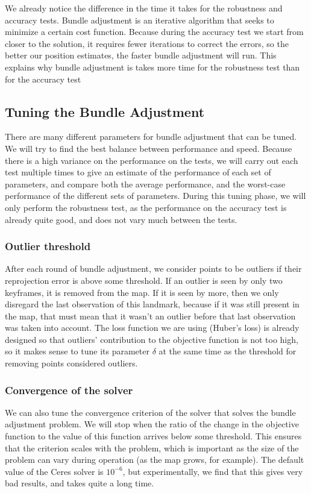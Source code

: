 We already notice the difference in the time it takes for the robustness and accuracy tests. Bundle adjustment is an iterative algorithm that seeks to minimize a certain cost function. Because during the accuracy test we start from closer to the solution, it requires fewer iterations to correct the errors, so the better our position estimates, the faster bundle adjustment will run. This explains why bundle adjustment is takes more time for the robustness test than for the accuracy test


\subsection{Tuning the Bundle Adjustment}
There are many different parameters for bundle adjustment that can be tuned. We will try to find the best balance between performance and speed. Because there is a high variance on the performance on the tests, we will carry out each test multiple times to give an estimate of the performance of each set of parameters, and compare both the average performance, and the worst-case performance of the different sets of parameters. During this tuning phase, we will only perform the robustness test, as the performance on the accuracy test is already quite good, and does not vary much between the tests.

\subsubsection{Outlier threshold}\label{sec:outliers}
After each round of bundle adjustment, we consider points to be outliers if their reprojection error is above some threshold. If an outlier is seen by only two keyframes, it is removed from the map. If it is seen by more, then we only disregard the last observation of this landmark, because if it was still present in the map, that must mean that it wasn't an outlier before that last observation was taken into account. The loss function we are using (Huber's loss) is already designed so that outliers' contribution to the objective function is not too high, so it makes sense to tune its parameter $\delta$ at the same time as the threshold for removing points considered outliers.\\

\subsubsection{Convergence of the solver}
We can also tune the convergence criterion of the solver that solves the bundle adjustment problem. We will stop when the ratio of the change in the objective function to the value of this function arrives below some threshold. This ensures that the criterion scales with the problem, which is important as the size of the problem can vary during operation (as the map grows, for example). The default value of the Ceres solver is $10^{-6}$, but experimentally, we find that this gives very bad results, and takes quite a long time.\\

